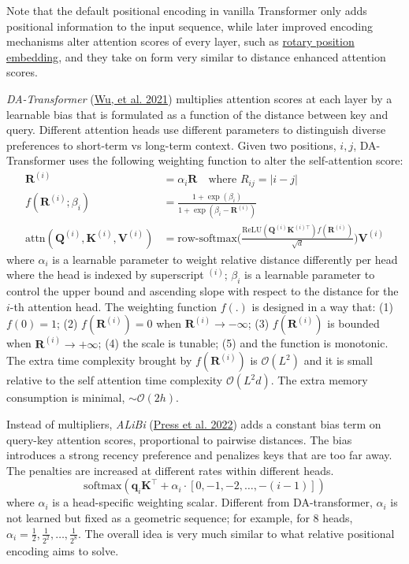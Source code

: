 \documentclass[12pt]{article}
\begin{document}
Note that the default positional encoding in vanilla Transformer only adds positional information to the input sequence, while later improved encoding mechanisms alter attention scores of every layer, such as \href{#rotary-position-embedding}{rotary position embedding}, and they take on form very similar to distance enhanced attention scores.

\emph{DA-Transformer} (\href{https://aclanthology.org/2021.naacl-main.166}{Wu, et al. 2021}) multiplies attention scores at each layer by a learnable bias that is formulated as a function of the distance between key and query. Different attention heads use different parameters to distinguish diverse preferences to short-term vs long-term context. Given two positions, $i, j$, DA-Transformer uses the following weighting function to alter the self-attention score:
\[
\begin{aligned}
\mathbf{R}^{(i)} &= \alpha_i \mathbf{R} \quad \text{where }R_{ij} = \vert i-j \vert\\
f(\mathbf{R}^{(i)}; \beta_i) &= \frac{1 + \exp(\beta_i)}{1 + \exp(\beta_i - \mathbf{R}^{(i)})} \\
\text{attn}(\mathbf{Q}^{(i)}, \mathbf{K}^{(i)}, \mathbf{V}^{(i)}) &= \text{row-softmax}\Big(\frac{\text{ReLU}(\mathbf{Q}^{(i)}\mathbf{K}^{(i)\top})f(\mathbf{R}^{(i)})}{\sqrt{d}}\Big) \mathbf{V}^{(i)}
\end{aligned}
\]
where $\alpha_i$ is a learnable parameter to weight relative distance differently per head where the head is indexed by superscript $^{(i)}$; $\beta_i$ is a learnable parameter to control the upper bound and ascending slope with respect to the distance for the $i$-th attention head. The weighting function $f(.)$ is designed in a way that: (1) $f(0)=1$; (2) $f(\mathbf{R}^{(i)}) = 0$ when $\mathbf{R}^{(i)} \to -\infty$; (3) $f(\mathbf{R}^{(i)})$ is bounded when $\mathbf{R}^{(i)} \to +\infty$; (4) the scale is tunable; (5) and the function is monotonic. The extra time complexity brought by $f(\mathbf{R}^{(i)})$ is $\mathcal{O}(L^2)$ and it is small relative to the self attention time complexity $\mathcal{O}(L^2 d)$. The extra memory consumption is minimal, $\sim\mathcal{O}(2h)$.

Instead of multipliers, \emph{ALiBi} (\href{https://arxiv.org/abs/2108.12409}{Press et al. 2022}) adds a constant bias term on query-key attention scores, proportional to pairwise distances. The bias introduces a strong recency preference and penalizes keys that are too far away. The penalties are increased at different rates within different heads.
\[
\text{softmax}(\mathbf{q}_i \mathbf{K}^\top + \alpha_i \cdot [0, -1, -2, \dots, -(i-1)])
\]
where $\alpha_i$ is a head-specific weighting scalar. Different from DA-transformer, $\alpha_i$ is not learned but fixed as a geometric sequence; for example, for 8 heads, ${\alpha_i} = {\frac{1}{2}, \frac{1}{2^2}, \dots, \frac{1}{2^8}}$. The overall idea is very much similar to what relative positional encoding aims to solve.
\end{document}
